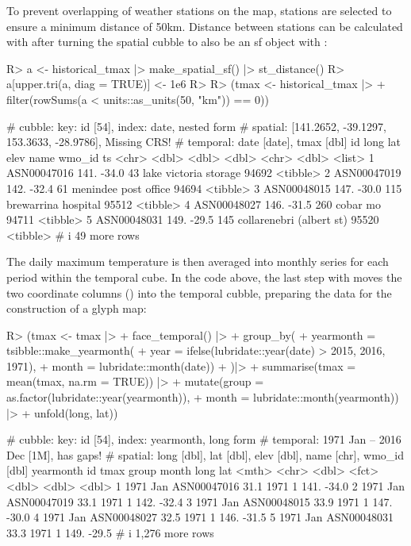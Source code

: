 \documentclass[
  shortnames]{jss}
\begin{document}
To prevent overlapping of weather stations on the map, stations are selected to ensure a minimum distance of 50km. Distance between stations can be calculated with  after turning the spatial cubble to also be an sf object with :

\begin{CodeChunk}
\begin{CodeInput}
R> a <- historical_tmax |> make_spatial_sf() |> st_distance()
R> a[upper.tri(a, diag = TRUE)] <- 1e6
R> 
R> (tmax <- historical_tmax |> 
+   filter(rowSums(a < units::as_units(50, "km")) == 0))
\end{CodeInput}
\begin{CodeOutput}
# cubble:   key: id [54], index: date, nested form
# spatial:  [141.2652, -39.1297, 153.3633, -28.9786], Missing CRS!
# temporal: date [date], tmax [dbl]
  id           long   lat  elev name                     wmo_id ts      
  <chr>       <dbl> <dbl> <dbl> <chr>                     <dbl> <list>  
1 ASN00047016  141. -34.0    43 lake victoria storage     94692 <tibble>
2 ASN00047019  142. -32.4    61 menindee post office      94694 <tibble>
3 ASN00048015  147. -30.0   115 brewarrina hospital       95512 <tibble>
4 ASN00048027  146. -31.5   260 cobar mo                  94711 <tibble>
5 ASN00048031  149. -29.5   145 collarenebri (albert st)  95520 <tibble>
# i 49 more rows
\end{CodeOutput}
\end{CodeChunk}

The daily maximum temperature is then averaged into monthly series for each period within the temporal cube. In the code above, the last step with  moves the two coordinate columns () into the temporal cubble, preparing the data for the construction of a glyph map:

\begin{CodeChunk}
\begin{CodeInput}
R> (tmax <- tmax |>
+   face_temporal() |> 
+   group_by(
+     yearmonth = tsibble::make_yearmonth(
+       year = ifelse(lubridate::year(date) > 2015, 2016, 1971),
+       month = lubridate::month(date))
+   )|>
+   summarise(tmax = mean(tmax, na.rm = TRUE)) |> 
+   mutate(group = as.factor(lubridate::year(yearmonth)),
+          month = lubridate::month(yearmonth)) |> 
+   unfold(long, lat))
\end{CodeInput}
\begin{CodeOutput}
# cubble:   key: id [54], index: yearmonth, long form
# temporal: 1971 Jan -- 2016 Dec [1M], has gaps!
# spatial:  long [dbl], lat [dbl], elev [dbl], name [chr], wmo_id [dbl]
  yearmonth id           tmax group month  long   lat
      <mth> <chr>       <dbl> <fct> <dbl> <dbl> <dbl>
1  1971 Jan ASN00047016  31.1 1971      1  141. -34.0
2  1971 Jan ASN00047019  33.1 1971      1  142. -32.4
3  1971 Jan ASN00048015  33.9 1971      1  147. -30.0
4  1971 Jan ASN00048027  32.5 1971      1  146. -31.5
5  1971 Jan ASN00048031  33.3 1971      1  149. -29.5
# i 1,276 more rows
\end{CodeOutput}
\end{CodeChunk}
\end{document}

